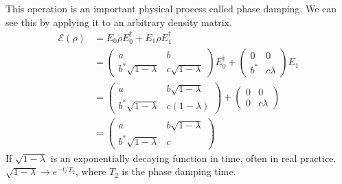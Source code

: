 \begin{example}
\begin{enumerate}
        This operation is an important physical process called phase damping. We can see this by applying it to an arbitrary density matrix. 
        \begin{align}
            \mathcal{E}(\rho) &= E_0\rho E_0^\dagger + E_1\rho E_1^\dagger \\
            &= \begin{pmatrix}a & b \\ b^*\sqrt{1-\lambda} & c\sqrt{1-\lambda}\end{pmatrix} E_0^\dagger + \begin{pmatrix}0 & 0 \\ b^* & c\lambda \end{pmatrix} E_1 \\
            &= \begin{pmatrix}a & b\sqrt{1-\lambda} \\ b^*\sqrt{1-\lambda}  & c(1-\lambda)\end{pmatrix} + \begin{pmatrix}0 & 0 \\ 0 & c\lambda \end{pmatrix} \\
            &= \begin{pmatrix}a & b\sqrt{1-\lambda} \\ b^*\sqrt{1-\lambda}  & c\end{pmatrix}
        \end{align}
        If $\sqrt{1-\lambda}$ is an exponentially decaying function in time, often in real practice. $\sqrt{1-\lambda} \rightarrow e^{-t/T_2}$, where $T_2$ is the phase damping time. 


\end{enumerate}
\end{example}
